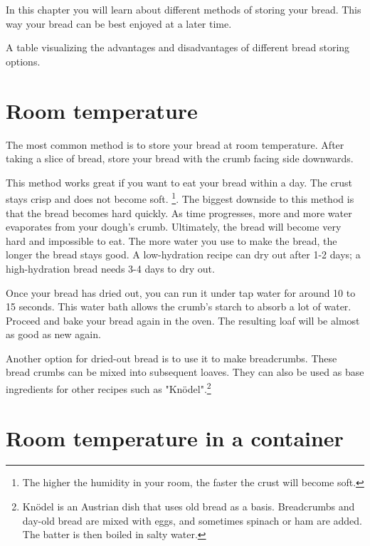 In this chapter you will learn about different
methods of storing your bread. This way
your bread can be best enjoyed at a later
time.

\begin{table}[!htb]
    \begin{center}
        
        \caption{A table visualizing the advantages and disadvantages
        of different bread storing options.}
        \label{table:bread-storage}
    \end{center}
\end{table}

\section{Room temperature}

The most common method is to store your bread
at room temperature. After taking a slice of bread,
store your bread with the crumb facing side
downwards.

This method works great if you want to eat
your bread within a day. The crust stays
crisp and does not become soft. \footnote{
  The higher the humidity in your room, the faster
  the crust will become soft.
}. The biggest downside to this method is that
the bread becomes hard quickly. As time progresses,
more and more water evaporates from your dough's
crumb. Ultimately, the bread will become very hard
and impossible to eat. The more water you use
to make the bread, the longer the bread stays good.
A low-hydration recipe can dry out after 1-2 days;
a high-hydration bread needs 3-4 days to dry out.

Once your bread has dried out, you can run it under
tap water for around 10 to 15 seconds. 
This water bath allows the
crumb's starch to absorb a lot of water. Proceed and
bake your bread again in the oven. The resulting loaf
will be almost as good as new again.

Another option for dried-out bread is to use it
to make breadcrumbs. These bread crumbs can be mixed
into subsequent loaves. They can also be used as
base ingredients for other recipes such as "Knödel".\footnote{
  Knödel is an Austrian dish that uses old bread as a basis.
  Breadcrumbs and day-old bread are mixed with eggs, and sometimes
  spinach or ham are added. The batter is then boiled in salty water.
}

\section{Room temperature in a container}


